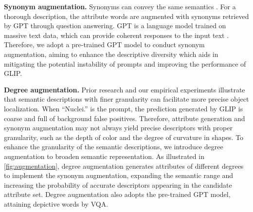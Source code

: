 \documentclass[journal,twoside,web]{ieeecolor}
\begin{document}
\textbf{Synonym augmentation.} Synonyms can convey the same semantics \cite{he2016automatic}. For a thorough description, the attribute words are augmented with synonyms retrieved by GPT through question answering. GPT is a language model trained on massive text data, which can provide coherent responses to the input text \cite{radford2019language}. Therefore, we adopt a pre-trained GPT model to conduct synonym augmentation, aiming to enhance the descriptive diversity which aids in mitigating the potential instability of prompts and improving the performance of GLIP.

\textbf{Degree augmentation.} Prior research \cite{li2022grounded,yamada2022lemons} and our empirical experiments illustrate that semantic descriptions with finer granularity can facilitate more precise object localization. When ``Nuclei.'' is the prompt, the prediction generated by GLIP is coarse and full of background false positives. Therefore, attribute generation and synonym augmentation may not always yield precise descriptors with proper granularity, such as the depth of color and the degree of curvature in shapes. To enhance the granularity of the semantic descriptions, we introduce degree augmentation to broaden semantic representation. As illustrated in \autoref{fig:augmentation}, degree augmentation generates attributes of different degrees to implement the synonym augmentation, expanding the semantic range and increasing the probability of accurate descriptors appearing in the candidate attribute set. Degree augmentation also adopts the pre-trained GPT model, attaining depictive words by VQA. 
\end{document}
